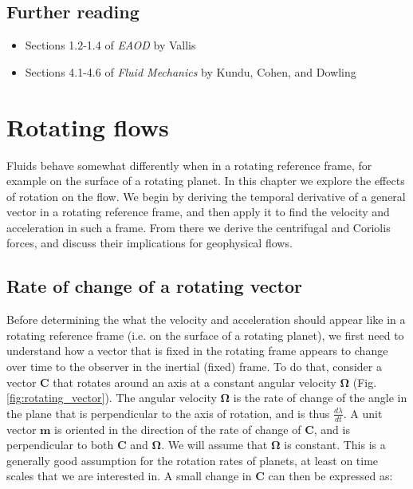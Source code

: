\documentclass[12pt]{article}
\numberwithin{equation}{section}
\numberwithin{figure}{section}
\numberwithin{table}{section}
\begin{document}
\subsection*{Further reading}

\begin{itemize}
  \item Sections 1.2-1.4 of \textit{EAOD} by Vallis
  \item Sections 4.1-4.6 of \textit{Fluid Mechanics} by Kundu, Cohen, and Dowling
\end{itemize}

\newpage
\section{Rotating flows}

Fluids behave somewhat differently when in a rotating reference frame, for
example on the surface of a rotating planet.
In this chapter we explore the effects of rotation on the flow.
We begin by deriving the temporal derivative of a general vector in a rotating
reference frame, and then apply it to find the velocity and acceleration in such
a frame.
From there we derive the centrifugal and Coriolis forces, and discuss their
implications for geophysical flows.

\subsection{Rate of change of a rotating vector}

Before determining the what the velocity and acceleration should appear like
in a rotating reference frame (i.e. on the surface of a rotating planet), we
first need to understand how a vector that is fixed in the rotating frame
appears to change over time to the observer in the inertial (fixed) frame.
To do that, consider a vector $\mathbf{C}$ that rotates around an axis at a
constant angular velocity $\mathbf{\Omega}$ (Fig. \ref{fig:rotating_vector}).
The angular velocity $\mathbf{\Omega}$ is the rate of change of the angle in
the plane that is perpendicular to the axis of rotation, and is thus
$\frac{d\lambda}{dt}$.
A unit vector $\mathbf{m}$ is oriented in the direction of the rate of change
of $\mathbf{C}$, and is perpendicular to both $\mathbf{C}$ and $\mathbf{\Omega}$.
We will assume that $\mathbf{\Omega}$ is constant.
This is a generally good assumption for the rotation rates of planets, at least
on time scales that we are interested in.
A small change in $\mathbf{C}$ can then be expressed as:
\end{document}
